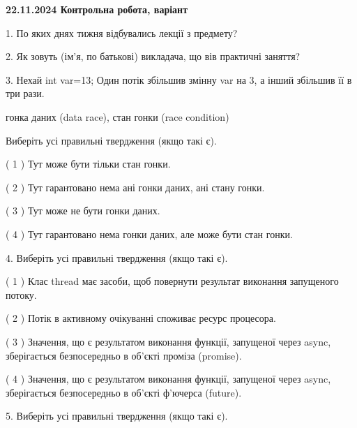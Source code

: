 \documentclass[12pt, ukrainian]{article}
\begin{document}
\vspace{4mm}
\newpage
\begin {large}

\textbf{22.11.2024 Контрольна робота, варіант  }\par


{
1. По яких днях тижня відбувались лекції з предмету?



\vspace{5mm}
2. Як зовуть (ім'я, по батькові) викладача, що вів практичні заняття?



\vspace{5mm}
3. Нехай int var=13; Один потік збільшив змінну var на 3, а інший збільшив її в три рази.

гонка даних (data race), стан гонки (race condition)

Виберіть усі правильні твердження (якщо такі є).\par
\vspace{2mm}
( 1 ) Тут може бути тільки стан гонки.%

( 2 ) Тут гарантовано нема ані гонки даних, ані стану гонки.%

( 3 ) Тут може не бути гонки даних.%

( 4 ) Тут гарантовано нема гонки даних, але може бути стан гонки.%


\vspace{5mm}
4. Виберіть усі правильні твердження (якщо такі є).\par
\vspace{2mm}

( 1 ) Клас thread має засоби, щоб повернути результат виконання запущеного потоку.%

( 2 ) Потік в активному очікуванні споживає ресурс процесора.%

( 3 ) Значення, що є результатом виконання функції, запущеної через async, зберігається безпосередньо в об’єкті проміза (promise).%

( 4 ) Значення, що є результатом виконання функції, запущеної через async, зберігається безпосередньо в об’єкті ф’ючерса (future).%


\vspace{5mm}
5. Виберіть усі правильні твердження (якщо такі є).\par
\vspace{2mm}

}
\end{large}
\end{document}
